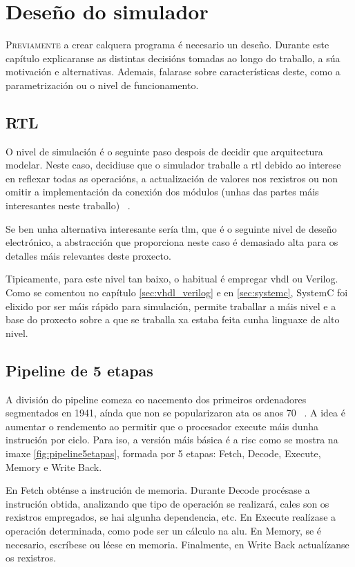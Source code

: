 \chapter{Deseño do simulador}
\label{chap:deseño_simulador}

\lettrine{P}{reviamente} a crear calquera programa é necesario un deseño. Durante este capítulo explicaranse as distintas decisións tomadas ao longo do traballo, a súa motivación e alternativas. Ademais, falarase sobre características deste, como a parametrización ou o nivel de funcionamento.

\section{RTL}\label{sec:rtl}
O nivel de simulación é o seguinte paso despois de decidir que arquitectura modelar. Neste caso, decidiuse que o simulador traballe a \acrshort{rtl} debido ao interese en reflexar todas as operacións, a actualización de valores nos rexistros ou non omitir a implementación da conexión dos módulos (unhas das partes máis interesantes neste traballo) ~\cite{rtl_wikipedia}.

Se ben unha alternativa interesante sería \acrshort{tlm}, que é o seguinte nivel de deseño electrónico, a abstracción que proporciona neste caso é demasiado alta para os detalles máis relevantes deste proxecto.  

Tipicamente, para este nivel tan baixo, o habitual é empregar \acrshort{vhdl} ou Verilog. Como se comentou no capítulo \ref{sec:vhdl_verilog} e en \ref{sec:systemc}, SystemC foi elixido por ser máis rápido para simulación, permite traballar a máis nivel e a base do proxecto sobre a que se traballa xa estaba feita cunha linguaxe de alto nivel.

\section{Pipeline de 5 etapas}\label{sec:pipeline_5etapas}
A división do pipeline comeza co nacemento dos primeiros ordenadores segmentados en 1941, aínda que non se popularizaron ata os anos 70 ~\cite{wiki_segmentacion}. A idea é aumentar o rendemento ao permitir que o procesador execute máis dunha instrución por ciclo. Para iso, a versión máis básica é a \acrfull{risc} como se mostra na imaxe \ref{fig:pipeline5etapas}, formada por 5 etapas: Fetch, Decode, Execute, Memory e Write Back.

En Fetch obténse a instrución de memoria. Durante Decode procésase a instrución obtida, analizando que tipo de operación se realizará, cales son os rexistros empregados, se hai algunha dependencia, etc. En Execute realízase a operación determinada, como pode ser un cálculo na \acrfull{alu}. En Memory, se é necesario, escríbese ou léese en memoria. Finalmente, en Write Back actualízanse os rexistros.


